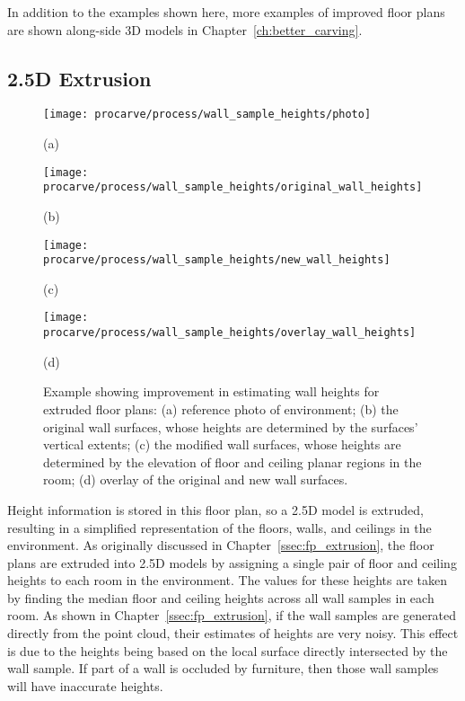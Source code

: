 \documentclass[12pt,onecolumn,oneside]{book}
\begin{document}
In addition to the examples shown here, more examples of improved floor plans are shown along-side 3D models in Chapter~\ref{ch:better_carving}.

\subsection{2.5D Extrusion}
\label{ssec:octree_fp_extrusion}

\begin{figure}

	\centering
	\begin{minipage}[t]{0.45\linewidth}
		\centerline{\texttt{[image: procarve/process/wall\_sample\_heights/photo]}}
		\centerline{(a)}
	\end{minipage}
	\hfill
	\begin{minipage}[t]{0.45\linewidth}
		\centerline{\texttt{[image: procarve/process/wall\_sample\_heights/original\_wall\_heights]}}
		\centerline{(b)}
	\end{minipage}
	
	\begin{minipage}[t]{0.45\linewidth}
		\centerline{\texttt{[image: procarve/process/wall\_sample\_heights/new\_wall\_heights]}}
		\centerline{(c)}
	\end{minipage}
	\hfill
	\begin{minipage}[t]{0.45\linewidth}
		\centerline{\texttt{[image: procarve/process/wall\_sample\_heights/overlay\_wall\_heights]}}
		\centerline{(d)}
	\end{minipage}

	\caption[Comparison of wall extrusion methods.]{Example showing improvement in estimating wall heights for extruded floor plans: (a) reference photo of environment; (b) the original wall surfaces, whose heights are determined by the surfaces' vertical extents; (c) the modified wall surfaces, whose heights are determined by the elevation of floor and ceiling planar regions in the room; (d) overlay of the original and new wall surfaces.}
	\label{fig:octree_wall_sample_heights}
\end{figure}

Height information is stored in this floor plan, so a 2.5D model is extruded, resulting in a simplified representation of the floors, walls, and ceilings in the environment.  As originally discussed in Chapter~\ref{ssec:fp_extrusion}, the floor plans are extruded into 2.5D models by assigning a single pair of floor and ceiling heights to each room in the environment.  The values for these heights are taken by finding the median floor and ceiling heights across all wall samples in each room.  As shown in Chapter~\ref{ssec:fp_extrusion}, if the wall samples are generated directly from the point cloud, their estimates of heights are very noisy.  This effect is due to the heights being based on the local surface directly intersected by the wall sample.  If part of a wall is occluded by furniture, then those wall samples will have inaccurate heights.
\end{document}
